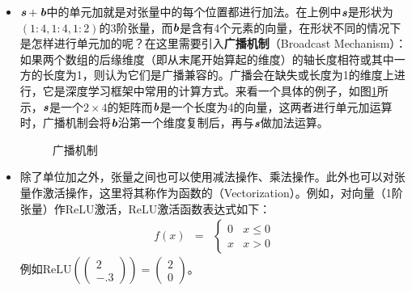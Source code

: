 \begin{itemize}
\vspace{0.5em}
\item $ {\textbf{\em s}}+{\textbf{\em b}} $中的单元加就是对张量中的每个位置都进行加法。在上例中$ {\textbf{\em s}} $是形状为$ (1:4,1:4,1:2) $的3阶张量，而$ {\textbf{\em b}}$是含有4个元素的向量，在形状不同的情况下是怎样进行单元加的呢？在这里需要引入{\small\sffamily\bfseries{广播机制}}（Broadcast Mechanism）：如果两个数组的后缘维度（即从末尾开始算起的维度）的轴长度相符或其中一方的长度为1，则认为它们是广播兼容的。广播会在缺失或长度为1的维度上进行，它是深度学习框架中常用的计算方式。来看一个具体的例子，如图\ref{fig:9-28}所示，$ {\textbf{\em s}} $是一个$ 2\times 4 $的矩阵而$ {\textbf{\em b}} $是一个长度为4的向量，这两者进行单元加运算时，广播机制会将$ {\textbf{\em b}} $沿第一个维度复制后，再与$ {\textbf{\em s}} $做加法运算。

\begin{figure}[htp]
\centering

\caption{广播机制}
\label{fig:9-28}
\end {figure}
\vspace{0.5em}
\item 除了单位加之外，张量之间也可以使用减法操作、乘法操作。此外也可以对张量作激活操作，这里将其称作为函数的{\small{}}（Vectorization）。例如，对向量（1阶张量）作ReLU激活，ReLU激活函数表达式如下：
\begin{eqnarray}
f(x)&=&\begin{cases} 0 & x\le 0 \\x & x>0\end{cases}
\label{eq:9-26}
\end{eqnarray}
\vspace{-0.5em}
例如$ {\textrm{ReLU}}\left( \begin{pmatrix} 2\\-.3\end{pmatrix}\right)=\begin{pmatrix} 2\\0\end{pmatrix} $。
\vspace{0.5em}
\end{itemize}



